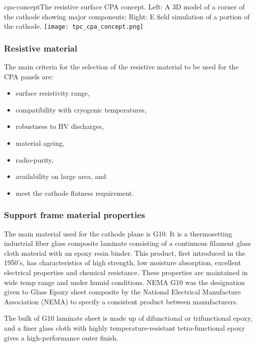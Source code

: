 \begin{cdrfigure}{cpa-concept}{The resistive surface CPA concept. 
 Left: A 3D model of a corner of the cathode showing major components;  Right: E field simulation of a portion of the cathode.} 
\texttt{[image: tpc\_cpa\_concept.png]}
\end{cdrfigure}


\subsubsection{Resistive material}

The main criteria for the selection of the resistive material to be used for the CPA panels are: 
\begin{itemize}	
\item surface resistivity range,
\item compatibility with cryogenic temperatures,
\item robustness to HV discharges, 
\item material ageing,
\item radio-purity,
\item availability on large area, and 
\item meet the cathode flatness requirement. 
\end{itemize}



\subsubsection{Support frame material properties}

The main material used for the cathode plane is G10. It is a thermosetting industrial fiber glass composite laminate consisting of a continuous filament glass cloth material with an epoxy resin binder. This product, first introduced in the 1950's, has characteristics of high strength, low moisture absorption, excellent electrical properties  and chemical resistance. These properties are maintained in wide temp range and under humid conditions.
NEMA G10 was the designation given to Glass Epoxy sheet composite by the National Electrical Manufacture Association (NEMA) to specify a consistent product between manufacturers. 




The bulk of G10 laminate sheet is made up of difunctional or trifunctional epoxy, and a finer glass cloth with highly temperature-resistant tetra-functional epoxy gives a high-performance outer finish. 

